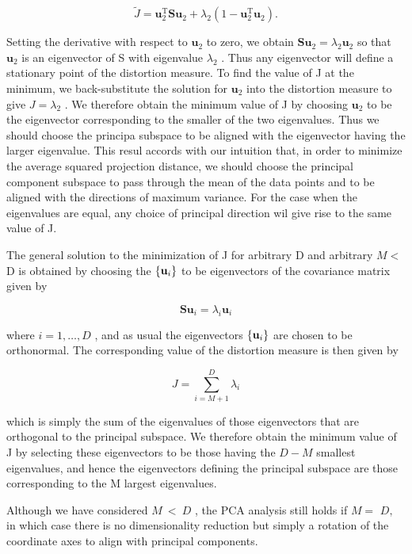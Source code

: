 \documentclass[
  10
]{article}
\begin{document}
\[
\widetilde {J} = \mathbf {u} _ {2} ^ {\mathrm{T}} \mathbf {S u} _ {2} + \lambda_ {2} \left(1 - \mathbf {u} _ {2} ^ {\mathrm{T}} \mathbf {u} _ {2}\right).\tag{12.16}
\]

Setting the derivative with respect to \(\mathbf { u } _ { 2 }\) to
zero, we obtain
\(\mathbf { S } \mathbf { u } _ { 2 } = \lambda _ { 2 } \mathbf { u } _ { 2 }\)
so that \(\mathbf { u } _ { 2 }\) is an eigenvector of S with eigenvalue
\(\lambda _ { 2 }\) . Thus any eigenvector will define a stationary
point of the distortion measure. To find the value of J at the minimum,
we back-substitute the solution for \(\mathbf { u } _ { 2 }\) into the
distortion measure to give \(J = \lambda _ { 2 }\) . We therefore obtain
the minimum value of J by choosing \(\mathbf { u } _ { 2 }\) to be the
eigenvector corresponding to the smaller of the two eigenvalues. Thus we
should choose the principa subspace to be aligned with the eigenvector
having the larger eigenvalue. This resul accords with our intuition
that, in order to minimize the average squared projection distance, we
should choose the principal component subspace to pass through the mean
of the data points and to be aligned with the directions of maximum
variance. For the case when the eigenvalues are equal, any choice of
principal direction wil give rise to the same value of J.

The general solution to the minimization of J for arbitrary D and
arbitrary \(M <\) D is obtained by choosing the
\(\left\{ { { \bf { u } } _ { i } } \right\}\) to be eigenvectors of the
covariance matrix given by

\[
\mathbf {S u} _ {i} = \lambda_ {i} \mathbf {u} _ {i}\tag{12.17}
\]

where \(i = 1 , \ldots , D\) , and as usual the eigenvectors
\(\left\{ { { \bf { u } } _ { i } } \right\}\) are chosen to be
orthonormal. The corresponding value of the distortion measure is then
given by

\[
J = \sum_ {i = M + 1} ^ {D} \lambda_ {i}\tag{12.18}
\]

which is simply the sum of the eigenvalues of those eigenvectors that
are orthogonal to the principal subspace. We therefore obtain the
minimum value of J by selecting these eigenvectors to be those having
the \(D - M\) smallest eigenvalues, and hence the eigenvectors defining
the principal subspace are those corresponding to the M largest
eigenvalues.

Although we have considered \(M \ < \ D\) , the PCA analysis still holds
if \(M =\) \(D ,\) in which case there is no dimensionality reduction
but simply a rotation of the coordinate axes to align with principal
components.
\end{document}
